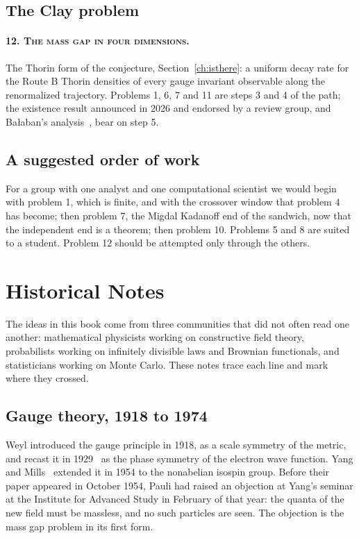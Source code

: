 \subsection{The Clay problem}

\paragraph{\normalfont\scshape 12. The mass gap in four dimensions.} The Thorin form of the conjecture, Section~\ref{ch:isthere}: a uniform decay rate for the Route B Thorin densities of every gauge invariant observable along the renormalized trajectory. Problems 1, 6, 7 and 11 are steps 3 and 4 of the path; the existence result announced in 2026 and endorsed by a review group, and Ba\l aban's analysis~\cite{Ba87}, bear on step 5.

\subsection{A suggested order of work}

For a group with one analyst and one computational scientist we would begin with problem 1, which is finite, and with the crossover window that problem 4 has become; then problem 7, the Migdal Kadanoff end of the sandwich, now that the independent end is a theorem; then problem 10. Problems 5 and 8 are suited to a student. Problem 12 should be attempted only through the others.

\section{Historical Notes}\label{ch:history}

The ideas in this book come from three communities that did not often read one another: mathematical physicists working on constructive field theory, probabilists working on infinitely divisible laws and Brownian functionals, and statisticians working on Monte Carlo. These notes trace each line and mark where they crossed.

\subsection{Gauge theory, 1918 to 1974}

Weyl introduced the gauge principle in 1918, as a scale symmetry of the metric, and recast it in 1929~\cite{We29} as the phase symmetry of the electron wave function. Yang and Mills~\cite{YM54} extended it in 1954 to the nonabelian isospin group. Before their paper appeared in October 1954, Pauli had raised an objection at Yang's seminar at the Institute for Advanced Study in February of that year: the quanta of the new field must be massless, and no such particles are seen. The objection is the mass gap problem in its first form.

